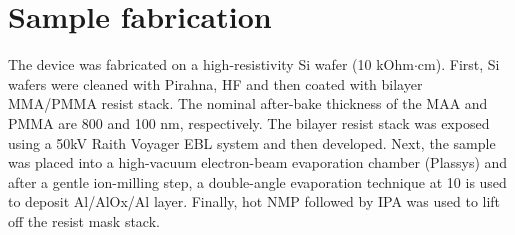 \documentclass[%
 aps, prx,
 amsmath,amssymb,
 reprint,%
superscriptaddress
]{revtex4-2}
\begin{document}
\section{Sample fabrication}\label{sec:fab}
The device was fabricated on a high-resistivity
Si wafer (10 kOhm$\cdot$cm). First, Si wafers 
were cleaned with Pirahna, HF and then coated 
with bilayer MMA/PMMA resist stack. The nominal 
after-bake thickness of the MAA and PMMA are 800 
and 100 nm, respectively. The
bilayer resist stack was exposed using a 50kV 
Raith Voyager EBL system and then developed. 
Next, the sample was placed into a high-vacuum 
electron-beam evaporation
chamber (Plassys) and after a gentle ion-milling 
step, a double-angle evaporation technique at 10 
is used to deposit Al/AlOx/Al layer. Finally, hot 
NMP followed by IPA was used to lift off the 
resist mask stack.


\end{document}
